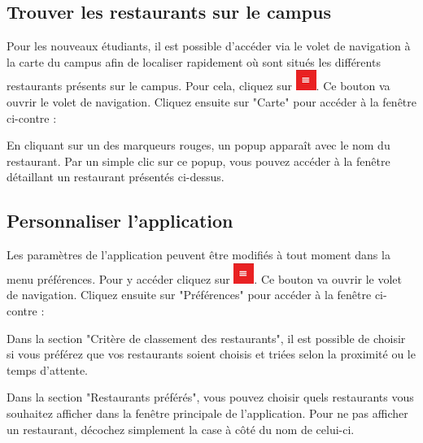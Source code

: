 \subsection{Trouver les restaurants sur le campus}
Pour les nouveaux étudiants, il est possible d'accéder via le volet de navigation
à la carte du campus afin de localiser rapidement où sont situés les différents
restaurants présents sur le campus.
Pour cela, cliquez sur \includegraphics{images/drawerButton.png}. Ce bouton va ouvrir le volet de navigation. Cliquez ensuite sur "Carte"
pour accéder à la fenêtre ci-contre : 

En cliquant sur un des marqueurs rouges, un popup apparaît avec le nom du
restaurant. Par un simple clic sur ce popup, vous pouvez accéder à la fenêtre
détaillant un restaurant présentés ci-dessus.

\subsection{Personnaliser l'application}
Les paramètres de l'application peuvent être modifiés à tout moment dans la menu
préférences. Pour y accéder cliquez sur \includegraphics{images/drawerButton.png}.
Ce bouton va ouvrir le volet de navigation. Cliquez ensuite sur "Préférences"
pour accéder à la fenêtre ci-contre : 

Dans la section "Critère de classement des restaurants", il est possible de choisir si vous 
préférez que vos restaurants soient choisis et triées selon la proximité ou le temps 
d'attente.

Dans la section "Restaurants préférés", vous pouvez choisir quels restaurants
vous souhaitez afficher dans la fenêtre principale de l'application. Pour ne
pas afficher un restaurant, décochez simplement la case à côté du nom de celui-ci.

